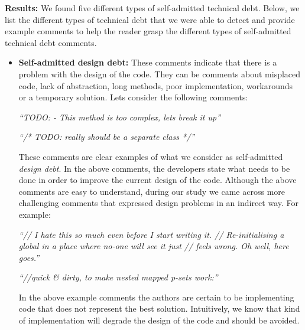 
\vspace{1mm}
\noindent\textbf{Results:} We found five different types of self-admitted technical debt. Below, we list the different types of technical debt that we were able to detect and provide example comments to help the reader grasp the different types of self-admitted technical debt comments.


\begin{itemize}
  \item \textbf{Self-admitted design debt:} These comments indicate that there is a problem with the design of the code. They can be comments about misplaced code, lack of abstraction, long methods, poor implementation, workarounds or a temporary solution. Lets consider the following comments:
  
  \vspace{1mm}
  \begin{displayquote}
     \textit{``TODO: - This method is too complex, lets break it up''}
     
     \vspace{1mm}

     \textit{``/* TODO: really should be a separate class */''}
  \end{displayquote}
  \vspace{1mm}

These comments are clear examples of what we consider as self-admitted \emph{design debt}. In the above comments, the developers state what needs to be done in order to improve the current design of the code. Although the above comments are easy to understand, during our study we came across more challenging comments that expressed design problems in an indirect way. For example: 
  
  \vspace{1mm}
  \begin{displayquote}
     \textit{``// I hate this so much even before I start writing it. // Re-initialising a global in a place where no-one will see it just // feels wrong.  Oh well, here goes.''}

     \vspace{1mm}

     \textit{``//quick \& dirty, to make nested mapped p-sets work:''}
  \end{displayquote}
  \vspace{1mm}

In the above example comments the authors are certain to be implementing code that does not represent the best solution. Intuitively, we know that kind of implementation will degrade the design of the code and should be avoided. 


\end{itemize}
